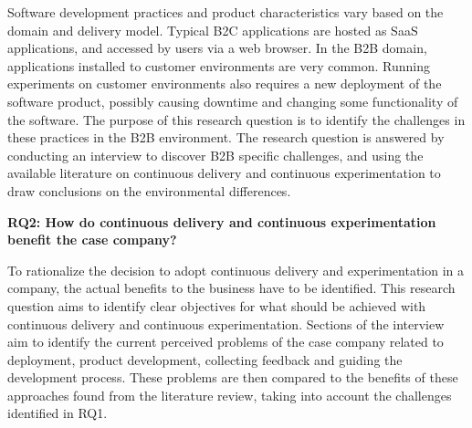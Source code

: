 \documentclass[english]{tktltiki2}
\theoremstyle{definition}
\theoremstyle{remark}
\begin{document}
\noindent Software development practices and product characteristics vary based on the domain and delivery model. Typical B2C applications are hosted as SaaS applications, and accessed by users via a web browser. In the B2B domain, applications installed to customer environments are very common. Running experiments on customer environments also requires a new deployment of the software product, possibly causing downtime and changing some functionality of the software. The purpose of this research question is to identify the challenges in these practices in the B2B environment. The research question is answered by conducting an interview to discover B2B specific challenges, and using the available literature on continuous delivery and continuous experimentation to draw conclusions on the environmental differences.
\newline




\noindent \textbf{RQ2: How do continuous delivery and continuous experimentation benefit the case company?} %

\noindent To rationalize the decision to adopt continuous delivery and experimentation in a company, the actual benefits to the business have to be identified. This research question aims to identify clear objectives for what should be achieved with continuous delivery and continuous experimentation. Sections of the interview aim to identify the current perceived problems of the case company related to deployment, product development, collecting feedback and guiding the development process. These problems are then compared to the benefits of these approaches found from the literature review, taking into account the challenges identified in RQ1.
\newline
\end{document}
